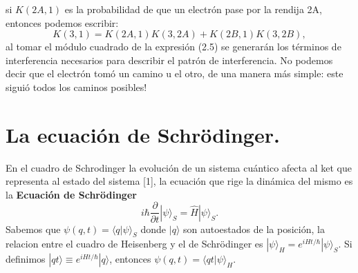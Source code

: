 si $K(2A,1)$ es la probabilidad de que un electrón pase por la rendija 2A, entonces podemos escribir:
\begin{equation}
K(3,1)=K(2A,1)K(3,2A)+K(2B,1)K(3,2B),
\end{equation}
al tomar el módulo cuadrado de la expresión (2.5) se generarán los términos de interferencia necesarios para describir el patrón de interferencia. No podemos decir que el electrón tomó un camino u el otro, de una manera más simple: este siguió todos los caminos posibles!

\section{La ecuación de Schrödinger.}
En el cuadro de Schrodinger la evolución de un sistema cuántico afecta al ket que representa al estado del sistema [1], la ecuación que rige la dinámica del mismo es la \textbf{Ecuación de Schrödinger}
\begin{equation}
i\hbar\frac{\partial}{\partial t}|\psi\rangle_S=\hat{H}|\psi\rangle_S.
\end{equation}
Sabemos que $\psi(q,t)=\langle q|\psi \rangle_S$ donde $|q\rangle$ son autoestados de la posición, la relacion entre el cuadro de Heisenberg y el de Schrödinger es $|\psi\rangle_H=e^{iHt/\hbar}|\psi\rangle_S$. Si definimos $|qt\rangle \equiv e^{iHt/\hbar}|q\rangle$, entonces $\psi (q,t)=\langle qt|\psi\rangle_H$.

